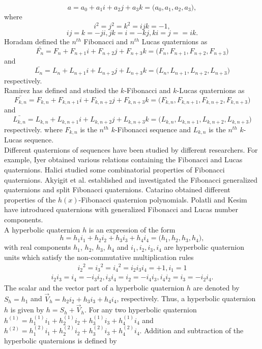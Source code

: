 $$a=a_0+a_1i+a_2j+a_3k=\big(a_0, a_1, a_2, a_3\big),$$
where
$$i^2=j^2=k^2=ijk=-1,$$
$$ij=k=-ji, jk=i=-kj, ki=j==ik.$$
Horadam\cite{18} defined  the $n^{th}$ Fibonacci and $n^{th}$ Lucas quaternions as
$$\bar{F_n}=F_n+F_{n+1}i+F_{n+2}j+F_{n+3}k=\big(F_n, F_{n+1}, F_{n+2}, F_{n+3}\big)$$
and
$$\bar{L_n}=L_n+L_{n+1}i+L_{n+2}j+L_{n+3}k=\big(L_n, L_{n+1}, L_{n+2}, L_{n+3}\big)$$
respectively.\\
Ramirez \cite{19} has defined and studied the $k$-Fibonacci and $k$-Lucas quaternions as
$$\bar{F_{k,n}}=F_{k,n}+F_{k,n+1}i+F_{k,n+2}j+F_{k,n+3}k=\big(F_{k,n}, F_{k,n+1}, F_{k,n+2}, F_{k,n+3}\big)$$
and
$$\bar{L_{k,n}}=L_{k,n}+L_{k,n+1}i+L_{k,n+2}j+L_{k,n+3}k=\big(L_{k,n}, L_{k,n+1}, L_{k,n+2}, L_{k,n+3}\big)$$
respectively. where $F_{k,n}$ is the ${n^{th}}$ $k$-Fibonacci sequence and $L_{k,n}$ is the ${n^{th}}$ $k$-Lucas sequence.\\
Different quaternions of sequences have been studied by different researchers. For example, Iyer \cite{20, 21} obtained various relations containing the Fibonacci and Lucas quaternions. Halici \cite{22} studied some combinatorial properties of Fibonacci quaternions. Akyigit et al. \cite{23,24} established and investigated the Fibonacci generalized quaternions and split Fibonacci quaternions. Catarino \cite{25} obtained different properties of the $h(x)$-Fibonacci quaternion polynomials. Polatli and Kesim \cite{26} have introduced quaternions with generalized Fibonacci and Lucas number components.\\
A hyperbolic quaternion $h$ is an expression of the form
$$h=h_1i_1+h_2i_2+h_3i_3+h_4i_4=\big(h_1, h_2, h_3, h_4\big),$$
with real components $h_1$, $h_2$, $h_3$, $h_4$ and  $i_1, i_2, i_3,i_4$ are hyperbolic quaternion units
which satisfy the non-commutative multiplication rules
\begin{align*}\label{1.1}
{i_2}^2={i_3}^2={i_4}^2=i_2i_3i_4=+1,i_1=1
\end{align*}
\begin{align}
i_2i_3=i_4=-i_3i_2, i_3i_4=i_2=-i_4i_3, i_4i_2=i_3=-i_2i_4.
\end{align}
The scalar and the vector part of a hyperbolic quaternion $h$ are denoted by $S_h=h_1$ and $\overrightarrow{V}_h=h_2i_2+h_3i_3+h_4i_4$, respectively. Thus, a hyperbolic quaternion $h$ is given by $h=S_h+\overrightarrow{V}_h$. For any two hyperbolic quaternion $h^{(1)}=h^{(1)}_1i_1+h^{(1)}_2i_2+h^{(1)}_3i_3+h^{(1)}_4i_4$ and 
$h^{(2)}=h^{(2)}_1i_1+h^{(2)}_2i_2+h^{(2)}_3i_3+h^{(2)}_4i_4$. Addition and subtraction of the hyperbolic quaternions is defined by
